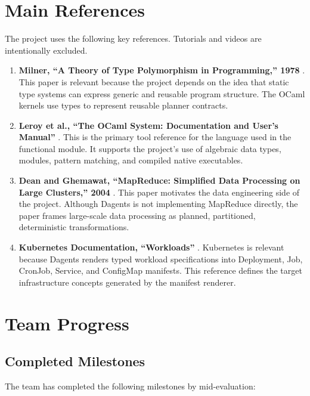 \documentclass[conference]{IEEEtran}
\begin{document}
\section{Main References}

The project uses the following key references. Tutorials and videos are
intentionally excluded.

\begin{enumerate}
  \item \textbf{Milner, ``A Theory of Type Polymorphism in Programming,'' 1978}
  \cite{milner1978}. This paper is relevant because the project depends on the
  idea that static type systems can express generic and reusable program
  structure. The OCaml kernels use types to represent reusable planner
  contracts.

  \item \textbf{Leroy et al., ``The OCaml System: Documentation and User's
  Manual''} \cite{ocamlmanual}. This is the primary tool reference for the
  language used in the functional module. It supports the project's use of
  algebraic data types, modules, pattern matching, and compiled native
  executables.

  \item \textbf{Dean and Ghemawat, ``MapReduce: Simplified Data Processing on
  Large Clusters,'' 2004} \cite{mapreduce}. This paper motivates the data
  engineering side of the project. Although Dagents is not implementing
  MapReduce directly, the paper frames large-scale data processing as planned,
  partitioned, deterministic transformations.

  \item \textbf{Kubernetes Documentation, ``Workloads''} \cite{kubernetes}.
  Kubernetes is relevant because Dagents renders typed workload specifications
  into Deployment, Job, CronJob, Service, and ConfigMap manifests. This
  reference defines the target infrastructure concepts generated by the
  manifest renderer.
\end{enumerate}

\section{Team Progress}

\subsection{Completed Milestones}

The team has completed the following milestones by mid-evaluation:
\end{document}

